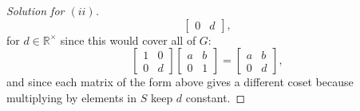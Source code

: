 \documentclass[12pt]{article}
\theoremstyle{remark}
\begin{document}
\begin{proof}[Solution for $(ii)$]
\begin{equation*}
\begin{bmatrix}
      0 & d
    \end{bmatrix},
  \end{equation*}
  for $d \in \mathbb{R}^\times$ since this would cover all of $G$:
  \begin{equation*}
    \begin{bmatrix}
      1 & 0\\
      0 & d
    \end{bmatrix}
    \begin{bmatrix}
      a & b\\
      0 & 1
    \end{bmatrix}
    =
    \begin{bmatrix}
      a & b\\
      0 & d
    \end{bmatrix},
  \end{equation*}
  and since each matrix of the form above gives a different coset because multiplying by elements in $S$ keep $d$ constant.
\end{proof}
\end{document}
